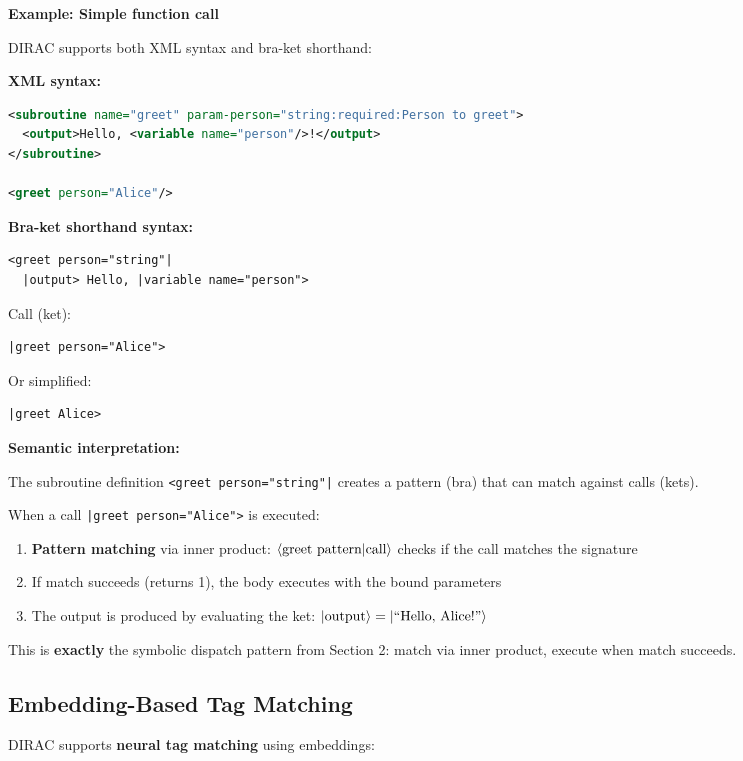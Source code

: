 \documentclass[11pt,a4paper]{article}
\theoremstyle{definition}
\begin{document}
\textbf{Example: Simple function call}

DIRAC supports both XML syntax and bra-ket shorthand:

\textbf{XML syntax:}
\begin{lstlisting}[language=XML]
<subroutine name="greet" param-person="string:required:Person to greet">
  <output>Hello, <variable name="person"/>!</output>
</subroutine>

<greet person="Alice"/>
\end{lstlisting}

\textbf{Bra-ket shorthand syntax:}
\begin{lstlisting}
<greet person="string"|
  |output> Hello, |variable name="person">
\end{lstlisting}

Call (ket):
\begin{lstlisting}
|greet person="Alice">
\end{lstlisting}

Or simplified:
\begin{lstlisting}
|greet Alice>
\end{lstlisting}

\textbf{Semantic interpretation:}

The subroutine definition \texttt{<greet person="string"|} creates a pattern (bra) that can match against calls (kets).

When a call \texttt{|greet person="Alice">} is executed:
\begin{enumerate}
\item \textbf{Pattern matching} via inner product: $\braket{\text{greet pattern}|\text{call}}$ checks if the call matches the signature
\item If match succeeds (returns 1), the body executes with the bound parameters
\item The output is produced by evaluating the ket: $\ket{\text{output}} = \ket{\text{``Hello, Alice!''}}$
\end{enumerate}

This is \textbf{exactly} the symbolic dispatch pattern from Section 2: match via inner product, execute when match succeeds.

\subsection{Embedding-Based Tag Matching}

DIRAC supports \textbf{neural tag matching} using embeddings:
\end{document}
